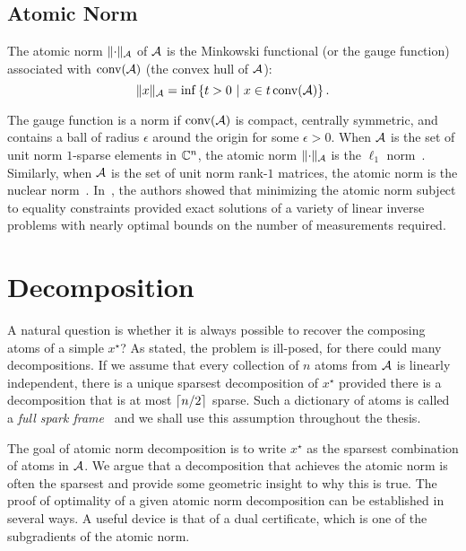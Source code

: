 
\subsection{Atomic Norm}

\begin{definition}
The atomic norm $\lVert\cdot\rVert_{\mathcal{A}}$ of $\mathcal{A}$ is the Minkowski functional (or the
gauge function) associated with $\operatorname{conv}(\mathcal{A})$ (the convex hull of $\mathcal{A}$):
\begin{equation}
	\label{defatnorm} \lVert x\rVert_{\mathcal{A}} = \inf\left\{t > 0 ~\middle|~ x \in t \operatorname{conv}(\mathcal{A}) \right\}. 
\end{equation}
\end{definition}

The gauge function is a norm if $\operatorname{conv}(\mathcal{A})$ is compact, centrally symmetric,
and contains a ball of radius $\epsilon$ around the origin for some
$\epsilon>0$. When $\mathcal{A}$ is the set of unit norm $1$-sparse elements in $\mathbb{C}^n$,
the atomic norm $\lVert\cdot\rVert_{\mathcal{A}}$ is the $\ell_1$ norm~\cite{candes06}.
Similarly, when $\mathcal{A}$ is the set of unit norm rank-$1$ matrices, the atomic norm
is the nuclear norm~\cite{Recht10}. In~\cite{crpw}, the authors showed that
minimizing the atomic norm subject to equality constraints provided exact
solutions of a variety of linear inverse problems with nearly optimal bounds on
the number of measurements required.

\section{Decomposition}

A natural question is whether it is always possible to recover the composing
atoms of a simple $x^\star$? As stated, the problem is ill-posed, for there
could many decompositions. If we assume that every collection of $n$ atoms from
$\mathcal{A}$ is linearly independent, there is a unique sparsest decomposition of
$x^\star$ provided there is a decomposition that is at most $\lceil n/2\rceil$ sparse.
Such a dictionary of atoms is called a \emph{full spark frame}~\cite{spark} and
we shall use this assumption throughout the thesis.

The goal of atomic norm decomposition is to write $x^\star$ as the
sparsest combination of atoms in $\mathcal{A}$. We argue that a decomposition that
achieves the atomic norm is often the sparsest and provide some geometric
insight to why this is true. The proof of optimality of a given atomic norm
decomposition can be established in several ways. A useful device is that of 
a dual certificate, which is one of the subgradients of the atomic norm.

